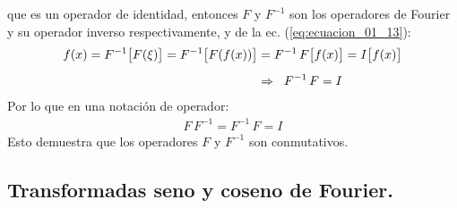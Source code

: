 que es un operador de identidad, entonces $F$ y $F^{-1}$ son los operadores de Fourier y
su operador inverso respectivamente, y de la ec. (\ref{eq:ecuacion_01_13}):
\begin{align}
\begin{aligned}[b]
f(x) = F^{-1} \big[ F(\xi) \big] = F^{-1} \big[ F(f(x)) \big] &= F^{-1} \, F \big[ f(x) \big] = I \big[ f(x) \big] \\[0.5em]
&\Rightarrow \hspace{0.2cm} F^{-1} \, F = I
\end{aligned}
\label{eq:ecuacion_01_16}
\end{align}
Por lo que en una notación de operador:
\begin{align*}
F \, F^{-1} = F^{-1} \, F = I
\end{align*}
Esto demuestra que los operadores $F$ y $F^{-1}$ son conmutativos.

\subsection{Transformadas seno y coseno de Fourier.}

